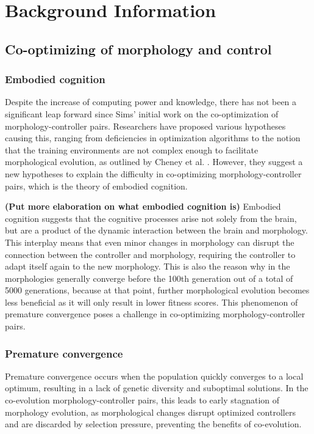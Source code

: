 \section{Background Information}

\subsection{Co-optimizing of morphology and control}
    \subsubsection{Embodied cognition}
        Despite the increase of computing power and knowledge, there has not been a significant leap forward since Sims' initial work on the co-optimization of morphology-controller pairs. Researchers have proposed various hypotheses causing this, ranging from deficiencies in optimization algorithms to the notion that the training environments are not complex enough to facilitate morphological evolution, as outlined by Cheney et al. \cite{Cheney_2016}. However, they suggest a new hypotheses to explain the difficulty in co-optimizing morphology-controller pairs, which is the theory of embodied cognition. 

        \textbf{(Put more elaboration on what embodied cognition is)} Embodied cognition suggests that the cognitive processes arise not solely from the brain, but are a product of the dynamic interaction between the brain and morphology. This interplay means that even minor changes in morphology can disrupt the connection between the controller and morphology, requiring the controller to adapt itself again to the new morphology. This is also the reason why in \cite{Cheney_2016} the morphologies generally converge before the 100th generation out of a total of 5000 generations, because at that point, further morphological evolution becomes less beneficial as it will only result in lower fitness scores. This phenomenon of premature convergence poses a challenge in co-optimizing morphology-controller pairs.
 
    \subsubsection{Premature convergence}
        Premature convergence occurs when the population quickly converges to a local optimum, resulting in a lack of genetic diversity and suboptimal solutions. In the co-evolution morphology-controller pairs, this leads to early stagnation of morphology evolution, as morphological changes disrupt optimized controllers and are discarded by selection pressure, preventing the benefits of co-evolution. \cite{Luis_2024}
        
